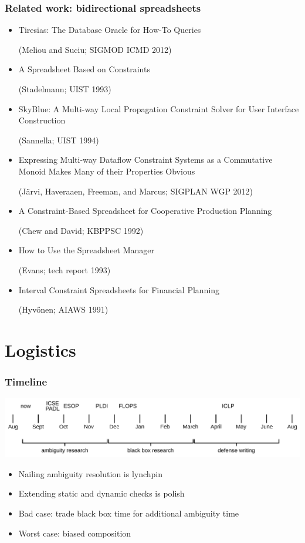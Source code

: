 \documentclass[14pt]{beamer}
\begin{document}
\begin{frame}
    \frametitle{Related work: bidirectional spreadsheets}
    \begin{itemize}
        \footnotesize
        \item Tiresias: The Database Oracle for How-To Queries

            \quad (Meliou and Suciu; SIGMOD ICMD 2012)
        \item A Spreadsheet Based on Constraints

            \quad (Stadelmann; UIST 1993)
        \item SkyBlue: A Multi-way Local Propagation Constraint Solver for
            User Interface Construction

            \quad (Sannella; UIST 1994)
        \item Expressing Multi-way Dataflow Constraint Systems as a
            Commutative Monoid Makes Many of their Properties Obvious

            \quad (J\" arvi, Haveraaen, Freeman, and Marcus; SIGPLAN WGP 2012)
        \item A Constraint-Based Spreadsheet for Cooperative Production
            Planning

            \quad (Chew and David; KBPPSC 1992)
        \item How to Use the Spreadsheet Manager

            \quad (Evans; tech report 1993)
        \item Interval Constraint Spreadsheets for Financial Planning

            \quad (Hyv\H onen; AIAWS 1991)
    \end{itemize}
\end{frame}

\section{Logistics}
\begin{frame}
    \frametitle{Timeline}
    \begin{center}
        \includegraphics[scale=0.45]{timeline.pdf}
    \end{center}
    \begin{itemize}
        \item Nailing ambiguity resolution is lynchpin
        \item Extending static and dynamic checks is polish
        \item Bad case: trade black box time for additional ambiguity time
        \item Worst case: biased composition
    \end{itemize}
\end{frame}
\end{document}
